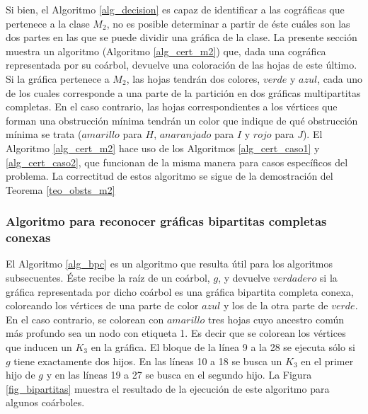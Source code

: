 Si bien, el Algoritmo \ref{alg_decision} es capaz de identificar a las cográficas que pertenece a la clase $M_2$, no es posible determinar a partir de éste cuáles son las dos partes en las que se puede dividir una gráfica de la clase. La presente sección muestra un algoritmo (Algoritmo \ref{alg_cert_m2}) que, dada una cográfica representada por su coárbol, devuelve una coloración de las hojas de este último. Si la gráfica pertenece a $M_2$, las hojas tendrán dos colores, $verde$ y $azul$, cada uno de los cuales corresponde a una parte de la partición en dos gráficas multipartitas completas. En el caso contrario, las hojas correspondientes a los vértices que forman una obstrucción mínima tendrán un color que indique de qué obstrucción mínima se trata ($amarillo$ para $H$, $anaranjado$ para $I$ y $rojo$ para $J$). El Algoritmo \ref{alg_cert_m2} hace uso de los Algoritmos \ref{alg_cert_caso1} y \ref{alg_cert_caso2}, que funcionan de la misma manera para casos específicos del problema. La correctitud de estos algoritmo se sigue de la demostración del Teorema \ref{teo_obsts_m2}

\subsubsection{Algoritmo para reconocer gráficas bipartitas completas conexas}

El Algoritmo \ref{alg_bpc} es un algoritmo que resulta útil para los algoritmos subsecuentes. Éste recibe la raíz de un coárbol, $g$, y devuelve $verdadero$ si la gráfica representada por dicho coárbol es una gráfica bipartita completa conexa, coloreando los vértices de una parte de color $azul$ y los de la otra parte de $verde$. En el caso contrario, se colorean con $amarillo$  tres hojas cuyo ancestro común más profundo sea un nodo con etiqueta 1. Es decir que se colorean los vértices que inducen un $K_3$ en la gráfica. El bloque de la línea 9 a la 28 se ejecuta sólo si $g$ tiene exactamente dos hijos. En las líneas 10 a 18 se busca un $K_3$ en el primer hijo de $g$ y en las líneas 19 a 27 se busca en el segundo hijo. La Figura \ref{fig_bipartitas} muestra el resultado de la ejecución de este algoritmo para algunos coárboles.

